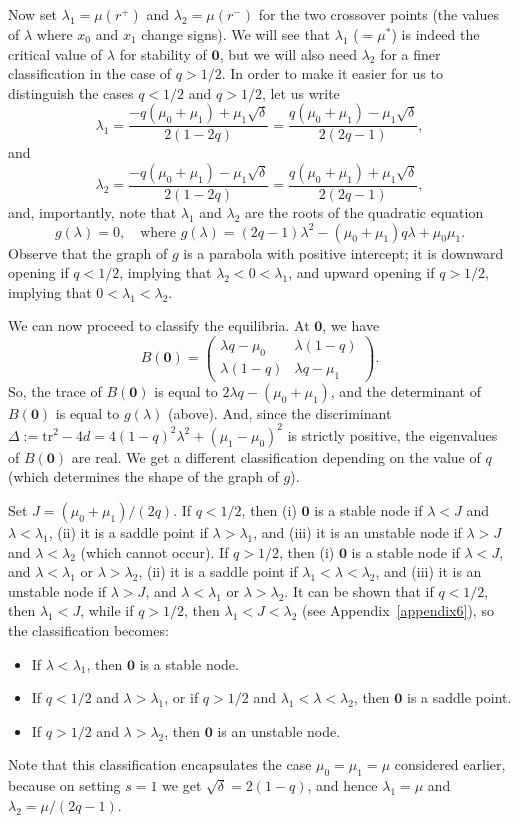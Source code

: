\documentclass[12pt]{article}
\newcommand{\tr}{\text{tr}}
\newcommand{\bzero}{\boldsymbol{0}}
\begin{document}
Now set $\lambda_1=\mu(r^+)$ and $\lambda_2=\mu(r^-)$ for the two
crossover points (the values of $\lambda$ where $x_0$ and $x_1$ change signs).
We will see that $\lambda_1$ ($=\mu^*$) is indeed the critical value of 
$\lambda$ for stability of $\bzero$, but we will also need $\lambda_2$ for a
finer classification in the case of $q>1/2$.
In order to make it easier for us to 
distinguish the cases $q<1/2$ and $q>1/2$, let us write
$$
\lambda_1
=\frac{-q(\mu_0+\mu_1)+\mu_1\sqrt{\delta}}{2(1-2q)}
=\frac{q(\mu_0+\mu_1)-\mu_1\sqrt{\delta}}{2(2q-1)},
$$
and
$$
\lambda_2
=\frac{-q(\mu_0+\mu_1)-\mu_1\sqrt{\delta}}{2(1-2q)}
=\frac{q(\mu_0+\mu_1)+\mu_1\sqrt{\delta}}{2(2q-1)},
$$
and, importantly, note that $\lambda_1$ and $\lambda_2$ are
the roots of the quadratic equation
$$
g(\lambda)=0,
\quad \text{where }
g(\lambda)=(2q-1)\lambda^2 - (\mu_0 + \mu_1)q\lambda + \mu_0\mu_1.
$$
Observe that the graph of $g$ is a parabola with positive intercept;
it is downward opening if $q<1/2$, 
implying that $\lambda_2<0<\lambda_1$,
and upward opening if $q>1/2$, 
implying that $0<\lambda_1<\lambda_2$.

We can now proceed to classify the equilibria. At $\bzero$, we have
$$
B(\bzero)=
\left(
\begin{matrix}
\lambda q-\mu_0 & \lambda (1-q) \\
\lambda (1-q) &\lambda q-\mu_1  
\end{matrix}
\right).
$$
So, the trace of $B(\bzero)$ is equal to $2\lambda q -(\mu_0+\mu_1)$, 
and the determinant of $B(\bzero)$ is equal to $g(\lambda)$ (above).
And, since the discriminant 
$\Delta:=\tr^2-4d=4(1-q)^2\lambda^2 + (\mu_1-\mu_0)^2$ is strictly
positive, the eigenvalues of $B(\bzero)$ are real.
We get a different classification depending on the value of $q$
(which determines the shape of the graph of $g$).

Set $J=(\mu_0+\mu_1)/(2q)$. If $q<1/2$, then
(i) $\bzero$ is a stable node 
if $\lambda < J$ and $\lambda<\lambda_1$, 
(ii) it is a saddle point if $\lambda>\lambda_1$, and
(iii) it is an unstable node if
$\lambda > J$ and $\lambda<\lambda_2$ (which cannot occur).
If $q>1/2$, then
(i) $\bzero$ is a stable node 
if $\lambda < J$, and $\lambda<\lambda_1$
or $\lambda>\lambda_2$,
(ii) it is a saddle point if $\lambda_1<\lambda<\lambda_2$, and
(iii) it is an unstable node
if $\lambda > J$, and $\lambda<\lambda_1$ or $\lambda>\lambda_2$.
It can be shown that if $q<1/2$, then $\lambda_1<J$,
while if $q>1/2$, then $\lambda_1<J<\lambda_2$
(see Appendix~\ref{appendix6}),
so the classification becomes:
\begin{itemize}
\item[(i)] If $\lambda<\lambda_1$, then $\bzero$ is a stable node.
\item[(ii)] If $q<1/2$ and $\lambda>\lambda_1$, or if
$q>1/2$ and $\lambda_1<\lambda<\lambda_2$, then $\bzero$ is a saddle point.
\item[(iii)] If $q>1/2$ and $\lambda>\lambda_2$, 
then $\bzero$ is an unstable node.
\end{itemize}
Note that this classification encapsulates the case 
$\mu_0=\mu_1=\mu$ considered earlier, because on setting $s=1$ we get
$\sqrt{\delta}=2(1-q)$, and hence $\lambda_1=\mu$ and
$\lambda_2=\mu/(2q-1)$.
\end{document}
